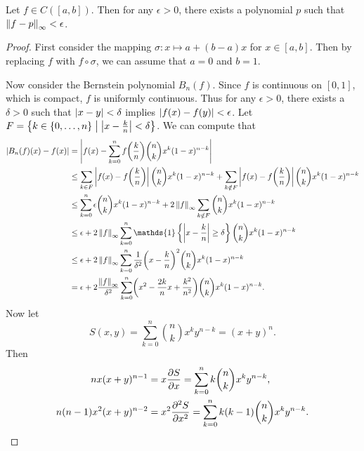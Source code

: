 \begin{theorem}[Weierstrass]
    Let $f\in C([a,b])$. Then for any $\epsilon>0$, there exists a polynomial 
    $p$ such that $\left\lVert {f-p} \right\rVert_\infty < \epsilon$.
\end{theorem}
\begin{proof}
    First consider the mapping $\sigma: x\mapsto a + (b-a)x$ for $x\in[a,b]$. 
    Then by replacing $f$ with $f\circ\sigma$, we can assume that $a=0$ and $b=1$. 
    
    Now consider the Bernstein polynomial $B_n(f)$. Since $f$ is continuous on 
    $[0,1]$, which is compact, $f$ is uniformly continuous. Thus for any 
    $\epsilon>0$, there exists a $\delta>0$ such that $\left\lvert {x-y} \right\rvert<\delta$ implies 
    $\left\lvert {f(x)-f(y)} \right\rvert<\epsilon$. Let $F = \left\{ k\in\left\{ {0,\ldots,n} \right\} \;\middle\vert\; \left\lvert {x - \frac{k}{n}} \right\rvert<\delta \right\}$. 
    We can compute that 
    \begin{equation*}
        \begin{split}
            \abs{B_n(f)(x) - f(x)} &= \abs{f(x) - \sum_{k=0}^n f\pth{\frac{k}{n}}\binom{n}{k}x^k(1-x)^{n-k}} \\
            &\leq \sum_{k\in F}\abs{f(x) - f\pth{\frac{k}{n}}}\binom{n}{k}x^k(1-x)^{n-k} + \sum_{k\notin F}\abs{f(x) - f\pth{\frac{k}{n}}}\binom{n}{k}x^k(1-x)^{n-k} \\ 
            &\leq \sum_{k=0}^n \epsilon\binom{n}{k}x^k(1-x)^{n-k} + 2\norm{f}_\infty\sum_{k\notin F}\binom{n}{k}x^k(1-x)^{n-k} \\
            &\leq \epsilon + 2\norm{f}_\infty\sum_{k=0}^n \mathds{1}\set{\abs{x-\frac{k}{n}}\geq\delta}\binom{n}{k}x^k(1-x)^{n-k} \\
            &\leq \epsilon + 2\norm{f}_\infty\sum_{k=0}^n \frac{1}{\delta^2}\pth{x-\frac{k}{n}}^2\binom{n}{k}x^k(1-x)^{n-k} \\ 
            &= \epsilon + 2\frac{\norm{f}_\infty}{\delta^2}\sum_{k=0}^{n}\pth{x^2 - \frac{2k}{n}x + \frac{k^2}{n^2}}\binom{n}{k}x^k(1-x)^{n-k}.
        \end{split}
    \end{equation*}
    Now let 
    \begin{equation*}
        S(x,y) = \sum_{k=0}^{n}\binom{n}{k}x^ky^{n-k} = (x+y)^n.
    \end{equation*}
    Then 
    \begin{align*}
        nx(x+y)^{n-1} &= x\pd{S}{x} = \sum_{k=0}^{n}k\binom{n}{k}x^ky^{n-k}, \\
        n(n-1)x^2(x+y)^{n-2} &= x^2\pdd{S}{x} = \sum_{k=0}^{n}k(k-1)\binom{n}{k}x^ky^{n-k}.

\end{align*}
\end{proof}
